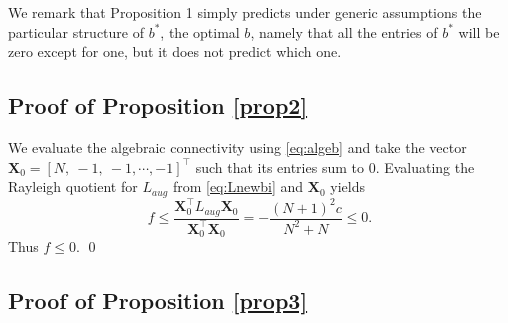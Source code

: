 \documentclass[%
 reprint,
 amsmath,amssymb,
 aip,
]{revtex4-2}
\def \bX {\pmb{X}}
\theoremstyle{italichead}
\theoremstyle{definition}
\begin{document}
{{We remark that Proposition 1 simply predicts under generic assumptions the particular structure of $b^*$, the optimal $b$, namely that all the entries of $b^*$ will be zero except for one, but it does not predict which one.}

\subsection{Proof of Proposition \ref{prop2}} \label{sec:prop2}

We evaluate the algebraic connectivity using \eqref{eq:algeb} and take the vector $\bX_0 = [N, \ -1, \allowbreak \ -1, \allowbreak \cdots, \allowbreak  -1]^\top$ such that its entries sum to 0.
Evaluating the Rayleigh quotient for $L_{aug}$ from \eqref{eq:Lnewbi} and $\bX_0$ yields
\begin{equation*}
    f \leq \dfrac{\bX_0^\top L_{aug} \bX_0}{\bX_0^\top \bX_0} = -\dfrac{(N+1)^2 c}{N^2 + N} \leq 0.
\end{equation*}
Thus $f \leq 0$. \hfill \qed



\subsection{Proof of Proposition \ref{prop3}} \label{sec:prop3}

}
\end{document}

